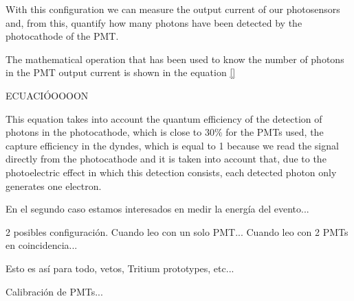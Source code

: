 With this configuration we can measure the output current of our photosensors and, from this, quantify how many photons have been detected by the photocathode of the PMT.

The mathematical operation that has been used to know the number of photons in the PMT output current is shown in the equation \ref{} 

ECUACIÓOOOON

This equation takes into account the quantum efficiency of the detection of photons in the photocathode, which is close to $30\%$ for the PMTs used, the capture efficiency in the dyndes, which is equal to 1 because we read the signal directly from the photocathode and it is taken into account that, due to the photoelectric effect in which this detection consists, each detected photon only generates one electron.


En el segundo caso estamos interesados en medir la energía del evento... 




2 posibles configuración. 
Cuando leo con un solo PMT...
Cuando leo con 2 PMTs en coincidencia...

Esto es así para todo, vetos, Tritium prototypes, etc...

Calibración de PMTs... 